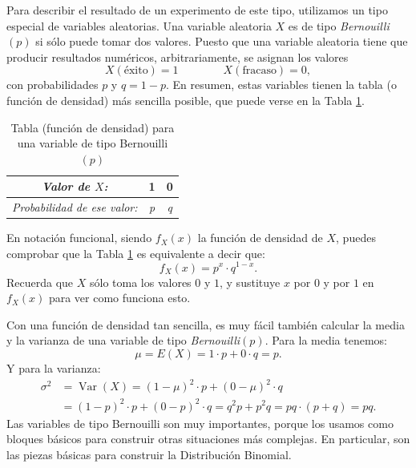 Para describir el resultado de un experimento de este tipo, utilizamos un tipo especial de variables aleatorias. Una variable aleatoria $X$ es de tipo {\em Bernouilli$(p)$}
si sólo puede tomar dos valores. Puesto que una variable aleatoria tiene que producir resultados numéricos, arbitrariamente, se asignan los valores
\[X(\text{éxito})= 1\qquad\qquad X(\text{fracaso})= 0,\]
con probabilidades $p$ y $q=1-p$. En resumen, estas variables tienen la tabla (o función de densidad) más sencilla posible, que puede verse  en la Tabla \ref{cap05:tabla:FuncionDensidadVariableBernouilli}.
    \begin{table}[hp]
    \begin{center}{\bf
    \begin{tabular}[t]{|c|c|c|}
        \hline
        \rule{0cm}{0.5cm}{\em Valor de $X$:}&1&0\\
        \hline
        \rule{0cm}{0.7cm}{\em Probabilidad de ese valor:}&{\em p}&{\em q}\\
        \hline
    \end{tabular}}
    \end{center}
    \label{cap05:tabla:FuncionDensidadVariableBernouilli}
    \caption{Tabla (función de densidad) para una variable de tipo Bernouilli$(p)$}
    \end{table}

\noindent En notación funcional, siendo $f_X(x)$ la función de densidad de $X$,  puedes comprobar que la Tabla \ref{cap05:tabla:FuncionDensidadVariableBernouilli} es equivalente a decir que:
\begin{equation}
\label{cap05:ecu:FuncionDensidadVariableBernouilli}
f_X(x)=p^{x}\cdot q^{1-x}.
\end{equation}
Recuerda que $X$ sólo toma los valores $0$ y $1$, y sustituye $x$ por $0$ y por $1$ en $f_X(x)$ para ver como funciona esto.

Con una función de densidad tan sencilla, es muy fácil también calcular la media y la varianza de una variable de tipo {\em Bernouilli$(p)$}. Para la media tenemos:
    \begin{equation}\label{cap05:ecu:MediaVariableBernouilli}
    \mu=E(X)=1\cdot p+0\cdot q=p.
    \end{equation}
Y para la varianza:
    \begin{equation}\label{cap05:ecu:VarianzaVariableBernouilli}
    \begin{array}{rl}
    \sigma^2& =\operatorname{Var}(X)=(1-\mu)^2\cdot p+(0-\mu)^2\cdot q\\
     &=(1-p)^2\cdot p+(0-p)^2\cdot q=q^2p+p^2q=pq\cdot(p+q)=pq.
    \end{array}
    \end{equation}
Las variables de tipo Bernouilli son muy importantes, porque los usamos como bloques básicos para construir otras situaciones más complejas. En particular, son las piezas básicas para construir la Distribución Binomial.

